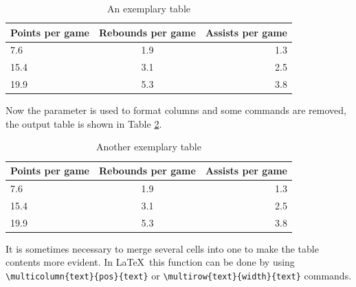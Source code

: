 	\begin{table}[h!]
		\centering
		\begin{tabular}{| l | c | r |}
			\hline
			Points per game & Rebounds per game & Assists per game \\ \hline
			7.6  & 1.9 & 1.3 \\ \hline
			15.4 & 3.1 & 2.5 \\ \hline
			19.9 & 5.3 & 3.8 \\ \hline
		\end{tabular}
		\caption{An exemplary table}
		\label{table_1}
	\end{table}
	
	Now the parameter {} is used to format columns and some {\color{blue}{\verb|\hline|}} commands are removed, the output table is shown in Table \ref{table_2}.
	
		\begin{table}[h!]
		\centering
		\begin{tabular}{| l  c  r |}
			\hline
			Points per game & Rebounds per game & Assists per game \\ \hline
			7.6  & 1.9 & 1.3 \\ 
			15.4 & 3.1 & 2.5 \\
			19.9 & 5.3 & 3.8 \\ \hline 
		\end{tabular}
		\caption{Another exemplary table}
		\label{table_2}
	\end{table}

	It is sometimes necessary to merge several cells into one to make the table contents more evident. In \LaTeX~this function can be done by using {\verb|\multicolumn{text}{pos}{text}|} or {\verb|\multirow{text}{width}{text}|} commands.

